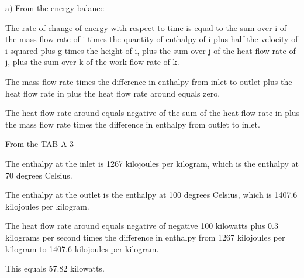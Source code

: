a) From the energy balance

The rate of change of energy with respect to time is equal to the sum over i of the mass flow rate of i times the quantity of enthalpy of i plus half the velocity of i squared plus g times the height of i, plus the sum over j of the heat flow rate of j, plus the sum over k of the work flow rate of k.

The mass flow rate times the difference in enthalpy from inlet to outlet plus the heat flow rate in plus the heat flow rate around equals zero.

The heat flow rate around equals negative of the sum of the heat flow rate in plus the mass flow rate times the difference in enthalpy from outlet to inlet.

From the TAB A-3

The enthalpy at the inlet is 1267 kilojoules per kilogram, which is the enthalpy at 70 degrees Celsius.

The enthalpy at the outlet is the enthalpy at 100 degrees Celsius, which is 1407.6 kilojoules per kilogram.

The heat flow rate around equals negative of negative 100 kilowatts plus 0.3 kilograms per second times the difference in enthalpy from 1267 kilojoules per kilogram to 1407.6 kilojoules per kilogram.

This equals 57.82 kilowatts.